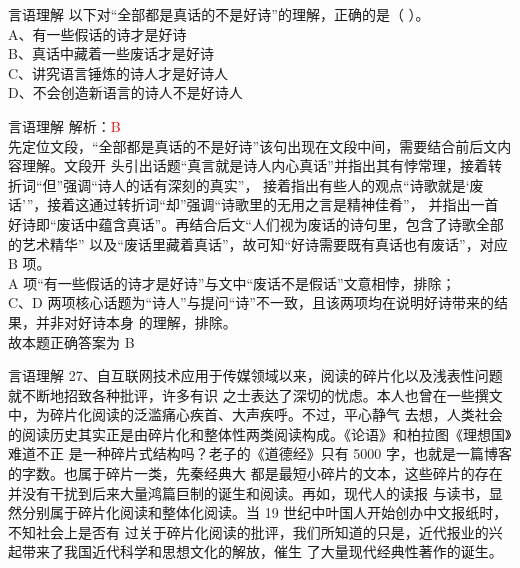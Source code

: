 \documentclass[aspectratio=169]{beamer}
\begin{document}
\begin{frame}[t]{言语理解}
    以下对“全部都是真话的不是好诗”的理解，正确的是（ ）。\\
    A、有一些假话的诗才是好诗\\
    B、真话中藏着一些废话才是好诗\\
    C、讲究语言锤炼的诗人才是好诗人\\
    D、不会创造新语言的诗人不是好诗人\\
\end{frame}





\begin{frame}[t]{言语理解}
    解析：\textcolor{red}{B}\\
    先定位文段，“全部都是真话的不是好诗”该句出现在文段中间，需要结合前后文内容理解。文段开
    头引出话题“真言就是诗人内心真话”并指出其有悖常理，接着转折词“但”强调“诗人的话有深刻的真实”，
    接着指出有些人的观点“诗歌就是‘废话’”，接着这通过转折词“却”强调“诗歌里的无用之言是精神佳肴”，
    并指出一首好诗即“废话中蕴含真话”。再结合后文“人们视为废话的诗句里，包含了诗歌全部的艺术精华”
    以及“废话里藏着真话”，故可知“好诗需要既有真话也有废话”，对应 B 项。\\
    A 项“有一些假话的诗才是好诗”与文中“废话不是假话”文意相悖，排除；\\
    C、D 两项核心话题为“诗人”与提问“诗”不一致，且该两项均在说明好诗带来的结果，并非对好诗本身
    的理解，排除。\\
    故本题正确答案为 B\\
\end{frame}



\begin{frame}[t]{言语理解}
    27、自互联网技术应用于传媒领域以来，阅读的碎片化以及浅表性问题就不断地招致各种批评，许多有识
    之士表达了深切的忧虑。本人也曾在一些撰文中，为碎片化阅读的泛滥痛心疾首、大声疾呼。不过，平心静气
    去想，人类社会的阅读历史其实正是由碎片化和整体性两类阅读构成。《论语》和柏拉图《理想国》难道不正
    是一种碎片式结构吗？老子的《道德经》只有 5000 字，也就是一篇博客的字数。也属于碎片一类，先秦经典大
    都是最短小碎片的文本，这些碎片的存在并没有干扰到后来大量鸿篇巨制的诞生和阅读。再如，现代人的读报
    与读书，显然分别属于碎片化阅读和整体化阅读。当 19 世纪中叶国人开始创办中文报纸时，不知社会上是否有
    过关于碎片化阅读的批评，我们所知道的只是，近代报业的兴起带来了我国近代科学和思想文化的解放，催生
    了大量现代经典性著作的诞生。\\
\end{frame}
\end{document}
